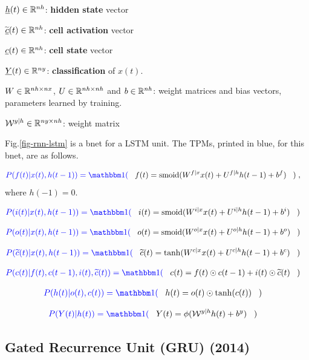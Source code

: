 $\rvh(t)\in \RR^{nh}$:
{\bf hidden state} vector

${\TIL{\rvc}}(t)\in \RR^{nh}$:
{\bf cell activation} vector

$\rvc(t)\in \RR^{nh}$:
{\bf cell state} vector

$\rvY(t)\in \RR^{ny}$:
{\bf classification} of $x(t)$.

$W\in { \mathbb{R}}^{nh\times nx}$,
$U\in { \mathbb{R}}^{nh\times nh}$
and 
$b\in { \mathbb{R}}^{nh}$:
weight matrices and bias vectors,
 parameters learned by training.

${\cal W}^{y|h}\in { \mathbb{R}}^{ny\times nh}$:
 weight matrix


Fig.\ref{fig-rnn-lstm}
is a bnet
for a LSTM unit.
The TPMs, printed in blue,
for this bnet, are
as follows.

\begin{align}\color{blue}
P(f(t)|x(t), h(t-1))=\indi(\;\;\;&
f(t)=\smoid(W^{f|x}x(t)+
U^{f|h}h(t-1)+b^{f})
\;\;\;)
\;,
\end{align}
where $h(-1)=0$.

\begin{align}\color{blue}
P(i(t)|x(t), h(t-1))=\indi(\;\;\;&
i(t)=\smoid(W^{i|x}x(t)
+U^{i|h}h(t-1)+b^{i})
\;\;\;)
\end{align}

\begin{align}\color{blue}
P(o(t)|x(t), h(t-1))=\indi(\;\;\;&
o(t)=\smoid(W^{o|x}x(t)
+U^{o|h}h(t-1)+b^{o})
\;\;\;)
\end{align}

\begin{align}\color{blue}
P(\TIL{c}(t)|x(t), h(t-1))=\indi(\;\;\;&
\TIL{c}(t)=\tanh
(W^{c|x}x(t)+U^{c|h}h(t-1)+b^{c})
\;\;\;)
\end{align}

\begin{align}\color{blue}
P(c(t)|f(t), c(t-1), i(t),
 \TIL{c}(t))
=\indi(\;\;\;&
c(t)=f(t)\odot c(t-1)+
i(t)\odot {\TIL{c}}(t)
\;\;\;)
\end{align}

\begin{align}\color{blue}
P(h(t)|o(t), c(t))=\indi(\;\;\;&
h(t)=o(t)\odot \tanh
(c(t))
\;\;\;)
\end{align}



\begin{align}\color{blue}
P(Y(t)|h(t))=\indi(\;\;\;&
Y(t)= \phi(\calw^{y|h}h(t) + b^y)
\;\;\;)
\end{align}

\newpage
\subsection{Gated Recurrence Unit
 (GRU) (2014)}


